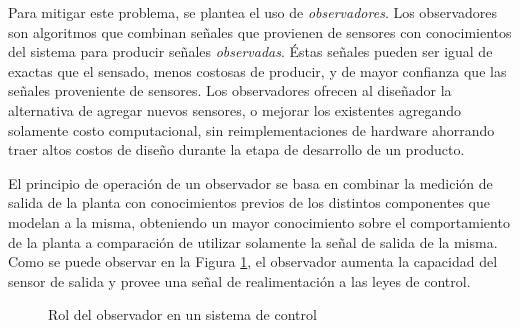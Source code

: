 \documentclass[10pt,a4paper]{article}
\begin{document}
\noindent Para mitigar este problema, se plantea el uso de \emph{observadores}. 
Los observadores son algoritmos que combinan señales que provienen de sensores 
con conocimientos del sistema para producir señales \emph{observadas}. 
\'Estas señales pueden ser igual de exactas que el sensado, menos costosas de 
producir, y de mayor confianza que las señales proveniente de sensores. 
Los observadores ofrecen al diseñador la alternativa de agregar nuevos 
sensores, o mejorar los existentes agregando solamente costo computacional, sin 
reimplementaciones de hardware ahorrando traer altos costos de diseño durante la
etapa de desarrollo de un producto.

\noindent El principio de operaci\'on de un observador se basa en combinar la
medici\'on de salida de la planta con conocimientos previos de los distintos 
componentes que modelan a la misma, obteniendo un mayor conocimiento sobre el 
comportamiento de la planta a comparaci\'on de utilizar solamente la señal de 
salida de la misma. Como se puede observar en la Figura \ref{role_observer}, el 
observador aumenta la capacidad del sensor de salida y provee una señal de 
realimentaci\'on a las leyes de control.

\begin{figure}[h!]
    \begin{center}
    \caption{Rol del observador en un sistema de control}
    \label{role_observer}
    \end{center}
\end{figure}
\FloatBarrier
\end{document}
